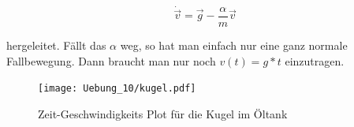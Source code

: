 \begin{equation*}
\dot{\vec{v}} = \vec{g} - \frac{\alpha}{m} \vec{v}
\end{equation*}

hergeleitet. Fällt das $\alpha$ weg, so hat man einfach nur eine ganz normale Fallbewegung. Dann braucht man nur noch $v(t) = g*t$ einzutragen.

\begin{figure}[h]
\begin{center}
\texttt{[image: Uebung\_10/kugel.pdf]}
\caption{Zeit-Geschwindigkeits Plot für die Kugel im Öltank}
\end{center}
\end{figure}

